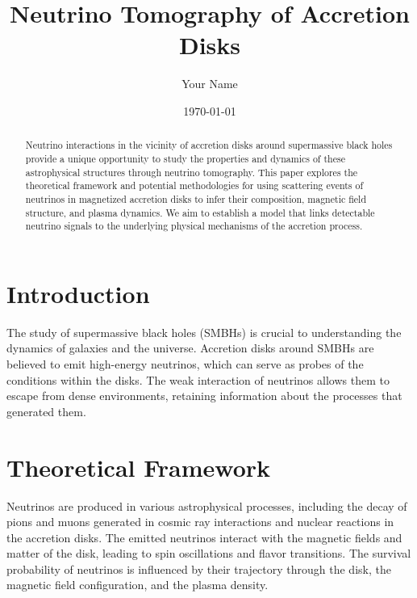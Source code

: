 \documentclass{article}
\title{Neutrino Tomography of Accretion Disks}
\author{Your Name}
\date{\today}
\begin{document}
\maketitle
\begin{abstract}
\noindent
Neutrino interactions in the vicinity of accretion disks around supermassive black holes provide a unique opportunity to study the properties and dynamics of these astrophysical structures through neutrino tomography. This paper explores the theoretical framework and potential methodologies for using scattering events of neutrinos in magnetized accretion disks to infer their composition, magnetic field structure, and plasma dynamics. We aim to establish a model that links detectable neutrino signals to the underlying physical mechanisms of the accretion process.
\end{abstract}
\section{Introduction}
\noindent
The study of supermassive black holes (SMBHs) is crucial to understanding the dynamics of galaxies and the universe. Accretion disks around SMBHs are believed to emit high-energy neutrinos, which can serve as probes of the conditions within the disks. The weak interaction of neutrinos allows them to escape from dense environments, retaining information about the processes that generated them.
\section{Theoretical Framework}
\noindent
Neutrinos are produced in various astrophysical processes, including the decay of pions and muons generated in cosmic ray interactions and nuclear reactions in the accretion disks. The emitted neutrinos interact with the magnetic fields and matter of the disk, leading to spin oscillations and flavor transitions. The survival probability of neutrinos is influenced by their trajectory through the disk, the magnetic field configuration, and the plasma density.
\end{document}
